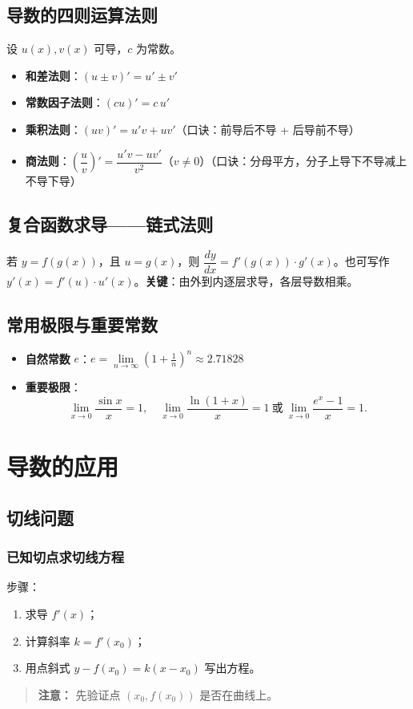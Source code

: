 \documentclass[10pt]{article}
\begin{document}
\subsection{导数的四则运算法则}
设 $u(x),v(x)$ 可导，$c$ 为常数。
\begin{itemize}
    \item \textbf{和差法则}：$(u\pm v)' = u' \pm v'$
    \item \textbf{常数因子法则}：$(c u)' = c\, u'$
    \item \textbf{乘积法则}：$(uv)' = u'v + uv'$（口诀：前导后不导 + 后导前不导）
    \item \textbf{商法则}：$\left(\dfrac{u}{v}\right)' = \dfrac{u'v - uv'}{v^2}$（$v\neq0$）（口诀：分母平方，分子上导下不导减上不导下导）
\end{itemize}

\subsection{复合函数求导——链式法则}
若 $y=f(g(x))$，且 $u=g(x)$，则 $\dfrac{dy}{dx}=f'(g(x))\cdot g'(x)$。也可写作 $y'(x)=f'(u)\cdot u'(x)$。\textbf{关键}：由外到内逐层求导，各层导数相乘。

\subsection{常用极限与重要常数}
\begin{itemize}
    \item \textbf{自然常数} $e$：$e = \lim\limits_{n\to\infty}\left(1+\frac{1}{n}\right)^n \approx 2.71828$
    \item \textbf{重要极限}：
    $$\lim\limits_{x\to 0}\dfrac{\sin x}{x}=1,\quad \lim\limits_{x\to 0}\dfrac{\ln(1+x)}{x}=1\ \text{或}\ \lim\limits_{x\to 0}\dfrac{e^x-1}{x}=1.$$
\end{itemize}

\section{导数的应用}
\subsection{切线问题}
\subsubsection{已知切点求切线方程}
步骤：
\begin{enumerate}
    \item 求导 $f'(x)$；
    \item 计算斜率 $k=f'(x_0)$；
    \item 用点斜式 $y-f(x_0)=k(x-x_0)$ 写出方程。
\end{enumerate}
\begin{quote}
    \textbf{注意：} 先验证点 $(x_0,f(x_0))$ 是否在曲线上。
\end{quote}
\end{document}
